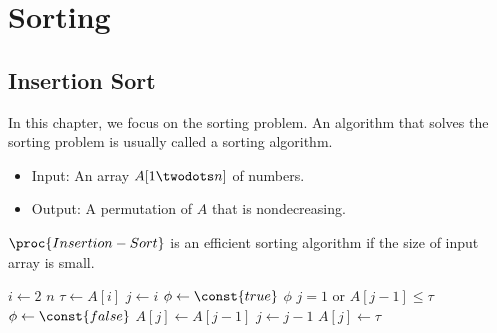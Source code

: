 \chapter{Sorting}
\section{Insertion Sort}
In this chapter, we focus on the sorting problem.
An algorithm that solves the sorting problem is usually called a sorting
algorithm.
\begin{problem}
  \leavevmode
  \begin{itemize}
    \item Input: An array $A[1 \twodots n]$ of numbers.
    \item Output: A permutation of $A$ that is nondecreasing.
  \end{itemize}
\end{problem}

\begin{algorithm}
  $\proc{Insertion-Sort}$ is an efficient sorting algorithm if the size of
  input array is small.
  \leavevmode
  \begin{codebox}
    \li \For $i \gets 2$ \To $n$ \Do
    \li     $\tau \gets A[i]$
    \li     $j \gets i$
    \li     $\phi \gets \const{true}$
    \li     \While $\phi$ \Do
    \li         \If $j = 1$ or $A[j-1] \leq \tau$ \Then
    \li             $\phi \gets \const{false}$
    \li         \Else
    \li             $A[j] \gets A[j-1]$
    \li             $j \gets j-1$
                \End
            \End
    \li     $A[j] \gets \tau$
        \End
  \end{codebox}
\end{algorithm}

